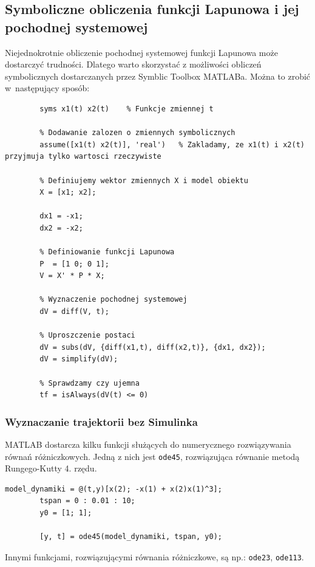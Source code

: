 \documentclass{article}
\begin{document}
    \subsection{Symboliczne obliczenia funkcji Lapunowa i jej pochodnej systemowej}
    Niejednokrotnie obliczenie pochodnej systemowej funkcji Lapunowa może dostarczyć trudności. Dlatego warto skorzystać z możliwości obliczeń symbolicznych dostarczanych przez Symblic Toolbox MATLABa.
    Można to zrobić w~następujący sposób:
    \begin{lstlisting}[style=Matlab-editor]
        % Definiowanie zmiennych symbolicznych
        syms x1(t) x2(t)    % Funkcje zmiennej t

        % Dodawanie zalozen o zmiennych symbolicznych
        assume([x1(t) x2(t)], 'real')   % Zakladamy, ze x1(t) i x2(t) przyjmuja tylko wartosci rzeczywiste

        % Definiujemy wektor zmiennych X i model obiektu
        X = [x1; x2];
        
        dx1 = -x1;
        dx2 = -x2;

        % Definiowanie funkcji Lapunowa
        P  = [1 0; 0 1];
        V = X' * P * X;

        % Wyznaczenie pochodnej systemowej
        dV = diff(V, t);

        % Uproszczenie postaci
        dV = subs(dV, {diff(x1,t), diff(x2,t)}, {dx1, dx2});
        dV = simplify(dV);

        % Sprawdzamy czy ujemna
        tf = isAlways(dV(t) <= 0)
    \end{lstlisting}

    \subsubsection{Wyznaczanie trajektorii bez Simulinka}
    MATLAB dostarcza kilku funkcji służących do numerycznego rozwiązywania równań różniczkowych.
    Jedną z nich jest \texttt{ode45}, rozwiązująca równanie metodą Rungego-Kutty 4. rzędu.
    \begin{lstlisting}[style=Matlab-editor]
        model_dynamiki = @(t,y)[x(2); -x(1) + x(2)x(1)^3];
        tspan = 0 : 0.01 : 10;
        y0 = [1; 1];
        
        [y, t] = ode45(model_dynamiki, tspan, y0);
    \end{lstlisting}
    Innymi funkcjami, rozwiązującymi równania różniczkowe, są np.: \texttt{ode23}, \texttt{ode113}.
\end{document}
